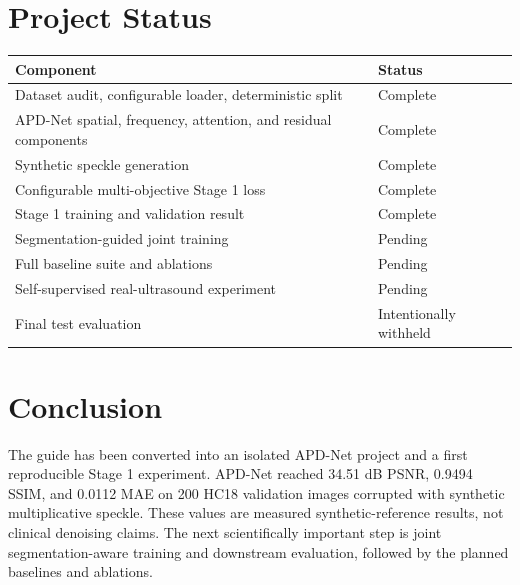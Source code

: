 \documentclass[11pt,a4paper]{article}
\begin{document}
\section{Project Status}
\begin{longtable}{p{}p{}}
\toprule
Component & Status \\
\midrule
Dataset audit, configurable loader, deterministic split & Complete \\
APD-Net spatial, frequency, attention, and residual components & Complete \\
Synthetic speckle generation & Complete \\
Configurable multi-objective Stage 1 loss & Complete \\
Stage 1 training and validation result & Complete \\
Segmentation-guided joint training & Pending \\
Full baseline suite and ablations & Pending \\
Self-supervised real-ultrasound experiment & Pending \\
Final test evaluation & Intentionally withheld \\
\bottomrule
\end{longtable}

\section{Conclusion}
The guide has been converted into an isolated APD-Net project and a first reproducible Stage 1 experiment. APD-Net reached 34.51 dB PSNR, 0.9494 SSIM, and 0.0112 MAE on 200 HC18 validation images corrupted with synthetic multiplicative speckle. These values are measured synthetic-reference results, not clinical denoising claims. The next scientifically important step is joint segmentation-aware training and downstream evaluation, followed by the planned baselines and ablations.
\end{document}
